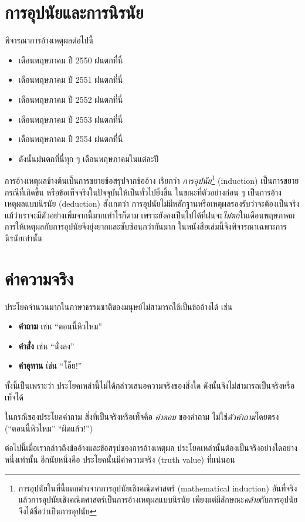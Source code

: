\documentclass[a4paper,12pt]{extbook}
\theoremstyle{definition}
\theoremstyle{remark}
\newcommand{\q}[1]{``#1''}
\begin{document}
			\section{การอุปนัยและการนิรนัย}
			พิจารณาการอ้างเหตุผลต่อไปนี้
			\begin{itemize}
				\item [] เดือนพฤษภาคม ปี 2550 ฝนตกที่นี่
				\item [] เดือนพฤษภาคม ปี 2551 ฝนตกที่นี่
				\item [] เดือนพฤษภาคม ปี 2552 ฝนตกที่นี่
				\item [] เดือนพฤษภาคม ปี 2553 ฝนตกที่นี่
				\item [] เดือนพฤษภาคม ปี 2554 ฝนตกที่นี่
				\item [] ดังนั้นฝนตกที่นี่ทุก ๆ เดือนพฤษภาคมในแต่ละปี
			\end{itemize}
			การอ้างเหตุผลข้างต้นเป็นการขยายข้อสรุปจากข้ออ้าง เรียกว่า \textit{การอุปนัย}\footnote{การอุปนัยในที่นี้แตกต่างจากการอุปนัยเชิงคณิตศาสตร์ (mathematical induction) อันที่จริงแล้วการอุปนัยเชิงคณิตศาสตร์เป็นการอ้างเหตุผลแบบนิรนัย เพียงแต่มีลักษณะ\textit{คล้าย}กับการอุปนัยจึงได้ชื่อว่าเป็นการอุปนัย} (induction) เป็นการขยายกรณีที่เกิดขึ้น หรือข้อเท็จจริงในปัจจุบันให้เป็นทั่วไปยิ่งขึ้น ในขณะที่ตัวอย่างก่อน ๆ เป็นการอ้างเหตุผลแบบนิรนัย (deduction) สังเกตว่า การอุปนัยไม่มีหลักฐานหรือเหตุผลรองรับว่าจะต้องเป็นจริง แม้ว่าเราจะมีตัวอย่างเพิ่มจากนี้มากเท่าไรก็ตาม เพราะยังคงเป็นไปได้ที่ฝนจะ\textit{ไม่ตก}ในเดือนพฤษภาคม การให้เหตุผลกับการอุปนัยจึงยุ่งยากและซับซ้อนกว่ากันมาก ในหนังสือเล่มนี้จึงพิจารณาเฉพาะการนิรนัยเท่านั้น
			\section{ค่าความจริง}
			ประโยคจำนวนมากในภาษาธรรมชาติของมนุษย์ไม่สามารถใช้เป็นข้ออ้างได้ เช่น
			\begin{itemize}
				\item \textbf{คำถาม} เช่น \q{ตอนนี้หิวไหม}
				\item \textbf{คำสั่ง} 	เช่น \q{นั่งลง}
				\item \textbf{คำอุทาน}	เ่ช่น \q{โอ๊ย!}
			\end{itemize}
			ทั้งนี้เป็นเพราะว่า ประโยคเหล่านี้ไม่ได้กล่าวเสนอความจริงของสิ่งใด ดังนั้นจึงไม่สามารถเป็นจริงหรือเท็จได้ 
			
			ในกรณีของประโยคคำถาม สิ่งที่เป็นจริงหรือเท็จคือ \textit{คำตอบ} ของคำถาม ไม่ใช่\textit{ตัวคำถาม}โดยตรง (\q{ตอนนี้หิวไหม} \q{ผิดแล้ว!}) 
			
			ต่อไปนี้เมื่อเรากล่าวถึงข้ออ้างและข้อสรุปของการอ้างเหตุผล ประโยคเหล่านั้นต้องเป็นจริงอย่างใดอย่างหนึ่งเท่านั้น อีกนัยหนึ่งคือ ประโยคนั้นมีค่าความจริง (truth value) ที่แน่นอน
			
\end{document}
